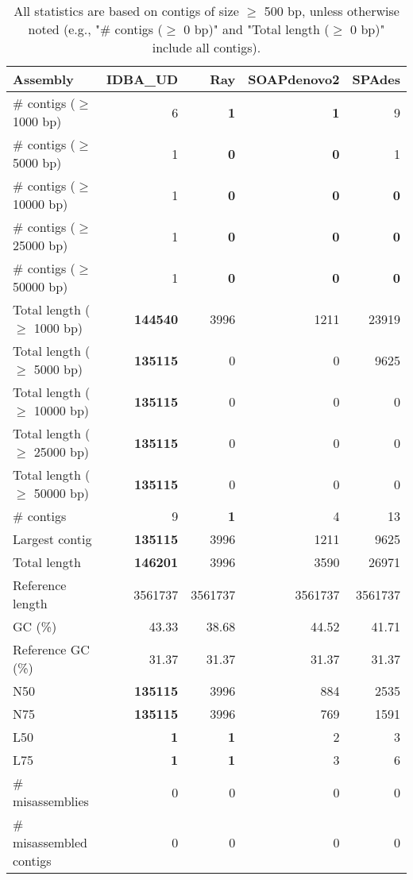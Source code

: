 \documentclass[12pt,a4paper]{article}
\begin{document}
\begin{table}[ht]
\begin{center}
\caption{All statistics are based on contigs of size $\geq$ 500 bp, unless otherwise noted (e.g., "\# contigs ($\geq$ 0 bp)" and "Total length ($\geq$ 0 bp)" include all contigs).}
\begin{tabular}{|l*{4}{|r}|}
\hline
Assembly & IDBA\_UD & Ray & SOAPdenovo2 & SPAdes \\ \hline
\# contigs ($\geq$ 1000 bp) & 6 & {\bf 1} & {\bf 1} & 9 \\ \hline
\# contigs ($\geq$ 5000 bp) & 1 & {\bf 0} & {\bf 0} & 1 \\ \hline
\# contigs ($\geq$ 10000 bp) & 1 & {\bf 0} & {\bf 0} & {\bf 0} \\ \hline
\# contigs ($\geq$ 25000 bp) & 1 & {\bf 0} & {\bf 0} & {\bf 0} \\ \hline
\# contigs ($\geq$ 50000 bp) & 1 & {\bf 0} & {\bf 0} & {\bf 0} \\ \hline
Total length ($\geq$ 1000 bp) & {\bf 144540} & 3996 & 1211 & 23919 \\ \hline
Total length ($\geq$ 5000 bp) & {\bf 135115} & 0 & 0 & 9625 \\ \hline
Total length ($\geq$ 10000 bp) & {\bf 135115} & 0 & 0 & 0 \\ \hline
Total length ($\geq$ 25000 bp) & {\bf 135115} & 0 & 0 & 0 \\ \hline
Total length ($\geq$ 50000 bp) & {\bf 135115} & 0 & 0 & 0 \\ \hline
\# contigs & 9 & {\bf 1} & 4 & 13 \\ \hline
Largest contig & {\bf 135115} & 3996 & 1211 & 9625 \\ \hline
Total length & {\bf 146201} & 3996 & 3590 & 26971 \\ \hline
Reference length & 3561737 & 3561737 & 3561737 & 3561737 \\ \hline
GC (\%) & 43.33 & 38.68 & 44.52 & 41.71 \\ \hline
Reference GC (\%) & 31.37 & 31.37 & 31.37 & 31.37 \\ \hline
N50 & {\bf 135115} & 3996 & 884 & 2535 \\ \hline
N75 & {\bf 135115} & 3996 & 769 & 1591 \\ \hline
L50 & {\bf 1} & {\bf 1} & 2 & 3 \\ \hline
L75 & {\bf 1} & {\bf 1} & 3 & 6 \\ \hline
\# misassemblies & 0 & 0 & 0 & 0 \\ \hline
\# misassembled contigs & 0 & 0 & 0 & 0 \\ \hline

\end{tabular}
\end{center}
\end{table}
\end{document}
